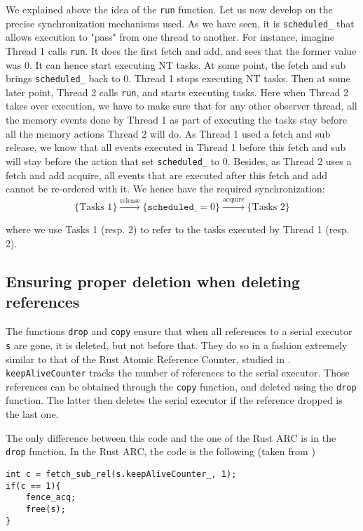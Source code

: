We explained above the idea of the \texttt{run} function. Let us now develop on the precise synchronization mechanisms used. As we have seen, it is \texttt{scheduled\_} that allows execution to "pass" from one thread to another. For instance, imagine Thread 1 calls \texttt{run}. It does the first fetch and add, and sees that the former value was 0. It can hence start executing NT tasks. At some point, the fetch and sub brings \texttt{scheduled\_} back to 0. Thread 1 stops executing NT tasks. Then at some later point, Thread 2 calls \texttt{run}, and starts executing tasks. Here when Thread 2 takes over execution, we have to make sure that for any other observer thread, all the memory events done by Thread 1 as part of executing the tasks stay before all the memory actions Thread 2 will do. As Thread 1 used a fetch and sub release, we know that all events executed in Thread 1 before this fetch and sub will stay before the action that set \texttt{scheduled\_} to 0. Besides, as Thread 2 uses a fetch and add acquire, all events that are executed after this fetch and add cannot be re-ordered with it. We hence have the required synchronization:
\[
				\{\text{Tasks 1}\} 
				\xrightarrow{\text{release}} 
				\{\mathtt{scheduled\_} = 0\} 
				\xrightarrow{\text{acquire}} 
				\{\text{Tasks 2}\}
		\]

where we use Tasks 1 (resp. 2) to refer to the tasks executed by Thread 1 (resp. 2).

\subsection{Ensuring proper deletion when deleting references}
The functions \texttt{drop} and \texttt{copy} ensure that when all references to a serial executor \texttt{s} are gone, it is deleted, but not before that. They do so in a fashion extremely similar to that of the Rust Atomic Reference Counter, studied in \cite{fsl}. \texttt{keepAliveCounter} tracks the number of references to the serial executor. Those references can be obtained through the \texttt{copy} function, and deleted using the \texttt{drop} function. The latter then deletes the serial executor if the reference dropped is the last one. 

The only difference between this code and the one of the Rust ARC is in the \texttt{drop} function. In the Rust ARC, the code is the following (taken from \cite{fsl})

\begin{lstlisting}
int c = fetch_sub_rel(s.keepAliveCounter_, 1);
if(c == 1){
	fence_acq;
	free(s);
}
\end{lstlisting}

